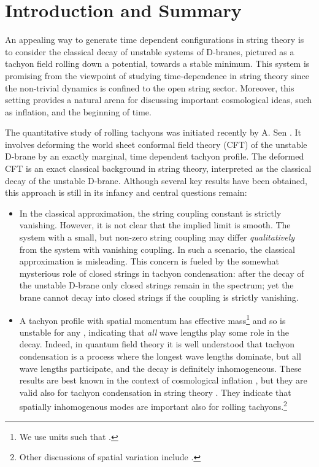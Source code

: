 \documentclass[a4paper,12pt]{article}
\begin{document}
\newpage

\section{Introduction and Summary}
An appealing way to generate time dependent  configurations in string theory is to consider the classical decay of unstable systems of D-branes, pictured as a tachyon field rolling 
down a potential, towards a stable minimum. This system is promising from the viewpoint of studying time-dependence in string theory since the  
non-trivial dynamics is confined to the open string sector. Moreover, this setting provides a natural
arena for discussing important cosmological ideas, such as inflation, and the beginning of time.

The quantitative study of rolling tachyons was initiated recently by A. Sen \cite{Sen1,Sen2,Sen3,senspac,Sen5}. 
It involves deforming
the world sheet conformal field theory (CFT) of  the unstable D-brane by an exactly marginal, 
time dependent tachyon profile. The deformed CFT is an exact classical background in string theory, 
interpreted as the classical decay of the unstable D-brane. Although several key results have 
been obtained, this approach is  still in its infancy and central questions remain: 
\begin{itemize}
\item
In the classical approximation, the string coupling constant is strictly vanishing.  However,
it is not clear that the implied limit  is smooth. The system with  a small, but non-zero string coupling may
 differ {\it qualitatively} from the system with vanishing coupling. In such a scenario,  the classical approximation is misleading. This 
concern is fueled by the somewhat mysterious role of closed strings in tachyon condensation: 
after the decay of the unstable D-brane only closed strings remain in the spectrum; yet the brane 
cannot  decay into closed strings if the coupling is strictly vanishing.
\item
A tachyon profile with 
spatial momentum \coordHE{} has effective mass\footnote{We use 
units such that \coordHE{}.}  \coordHE{} and so is unstable for any \coordHE{}, indicating that {\it all} wave lengths play some role in the decay. Indeed,  in 
quantum field theory it is well understood that tachyon condensation is a process where the longest wave lengths dominate, but all wave lengths participate, and  the decay is 
definitely inhomogeneous. These results are best known in the context of  cosmological 
inflation \cite{Guth:1985ya,Weinberg:1987vp}, but they are valid also for tachyon condensation in string theory \cite{Craps:2001jp}. They indicate that spatially inhomogenous modes are
important also for rolling tachyons.\footnote{
Other discussions of spatial variation include \cite{senspac,Felder:2002sv,Mukohyama:2002vq,bckr}.}
\end{itemize}
\end{document}
